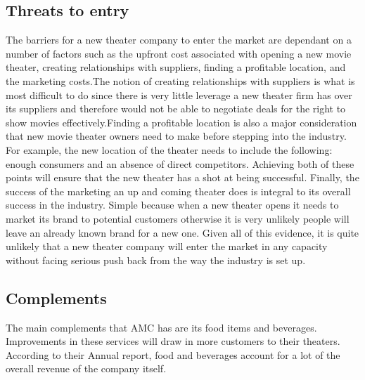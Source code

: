 \documentclass[12pt]{article}
\begin{document}
\subsection{Threats to entry}
The barriers for a new theater company to enter the market are dependant on a number of factors such as the upfront cost associated with opening a new movie theater, creating relationships with suppliers, finding a profitable location, and the marketing costs.The notion of creating relationships with suppliers is what is most difficult to do since there is very little leverage a new theater firm has over its suppliers and therefore would not be able to negotiate deals for the right to show movies effectively.Finding a profitable location is also a major consideration that new movie theater owners need to make before stepping into the industry. For example, the new location of the theater needs to include the following: enough consumers and an absence of direct competitors. Achieving both of these points will ensure that the new theater has a shot at being successful. Finally, the success of the marketing an up and coming theater does is integral to its overall success in the industry. Simple because when a new theater opens it needs to market its brand to potential customers otherwise it is very unlikely people will leave an already known brand for a new one. Given all of this evidence, it is quite unlikely that a new theater company will enter the market in any capacity without facing serious push back from the way the industry is set up.
\subsection{Complements}
The main complements that AMC has are its food items and beverages. Improvements in these services will draw in more customers to their theaters. According to their Annual report, food and beverages account for a lot of the overall revenue of the company itself.
\end{document}
